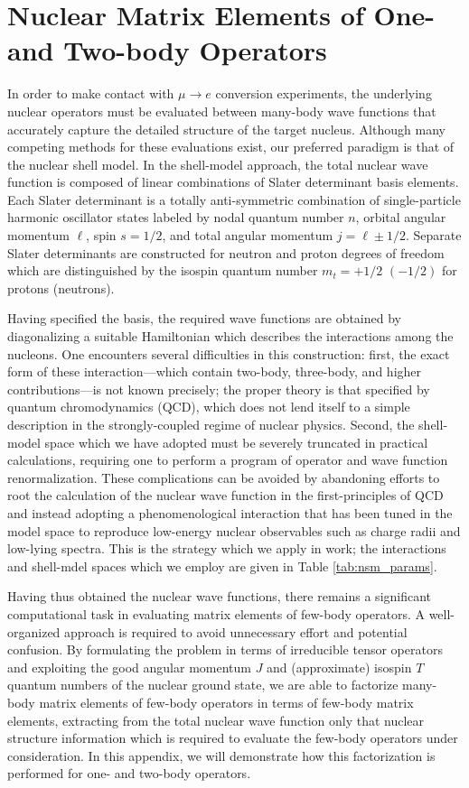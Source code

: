 \documentclass{book}[letterpaper,12pt]
\begin{document}
\chapter{Nuclear Matrix Elements of One- and Two-body Operators}
\thispagestyle{headings}
\label{app:density}
In order to make contact with $\mu\rightarrow e$ conversion experiments, the underlying nuclear operators must be evaluated between many-body wave functions that accurately capture the detailed structure of the target nucleus. Although many competing methods for these evaluations exist, our preferred paradigm is that of the nuclear shell model. In the shell-model approach, the total nuclear wave function is composed of linear combinations of Slater determinant basis elements. Each Slater determinant is a totally anti-symmetric combination of single-particle harmonic oscillator states labeled by nodal quantum number $n$, orbital angular momentum $\ell$, spin $s=1/2$, and total angular momentum $j=\ell\pm 1/2$. Separate Slater determinants are constructed for neutron and proton degrees of freedom which are distinguished by the isospin quantum number $m_t=+1/2$ $(-1/2)$ for protons (neutrons). 

Having specified the basis, the required wave functions are obtained by diagonalizing a suitable Hamiltonian which describes the interactions among the nucleons. One encounters several difficulties in this construction: first, the exact form of these interaction---which contain two-body, three-body, and higher contributions---is not known precisely; the proper theory is that specified by quantum chromodynamics (QCD), which does not lend itself to a simple description in the strongly-coupled regime of nuclear physics. Second, the shell-model space which we have adopted must be severely truncated in practical calculations, requiring one to perform a program of operator and wave function renormalization. These complications can be avoided by abandoning efforts to root the calculation of the nuclear wave function in the first-principles of QCD and instead adopting a phenomenological interaction that has been tuned in the model space to reproduce low-energy nuclear observables such as charge radii and low-lying spectra. This is the strategy which we apply in work; the interactions and shell-mdel spaces which we employ are given in Table \ref{tab:nsm_params}. 

Having thus obtained the nuclear wave functions, there remains a significant computational task in evaluating matrix elements of few-body operators. A well-organized approach is required to avoid unnecessary effort and potential confusion. By formulating the problem in terms of irreducible tensor operators and exploiting the good angular momentum $J$ and (approximate) isospin $T$ quantum numbers of the nuclear ground state, we are able to factorize many-body matrix elements of few-body operators in terms of few-body matrix elements, extracting from the total nuclear wave function only that nuclear structure information which is required to evaluate the few-body operators under consideration. In this appendix, we will demonstrate how this factorization is performed for one- and two-body operators.
\end{document}

